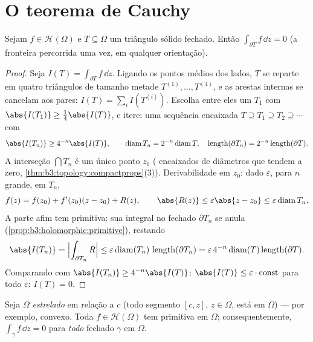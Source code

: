 \section{O teorema de Cauchy}

\begin{theorem}[Goursat]\label{thm:b3:holomorphic:goursat}
Sejam $f \in \mathcal H(\Omega)$ e $T \subseteq \Omega$ um triângulo sólido fechado. Então $\int_{\partial T}f\,\dd z = 0$ (a fronteira
percorrida uma vez, em qualquer orientação).
\end{theorem}

\begin{proof}
Seja $I(T) = \int_{\partial T}f\,\dd z$. Ligando os pontos médios dos lados, $T$ se reparte em
quatro triângulos de tamanho metade $T^{(1)},
\dots, T^{(4)}$, e as arestas internas se
cancelam aos pares: $I(T) =
\sum_iI(T^{(i)})$. Escolha entre eles um $T_1$ com $\abs{I(T_1)} \geq \frac14\abs{I(T)}$, e
itere: uma sequência encaixada $T \supseteq T_1 \supseteq T_2 \supseteq\cdots$ com
\[
\abs{I(T_n)} \geq 4^{-n}\abs{I(T)},
\qquad
\operatorname{diam}T_n = 2^{-n}\operatorname{diam}T,
\quad
\operatorname{length}(\partial T_n) =
2^{-n}\operatorname{length}(\partial T).
\]
A interseção $\bigcap T_n$ é um único ponto $z_0$ ( encaixados de
diâmetros que tendem a zero, \cref{thm:b3:topology:compactprops}(3)). Derivabilidade em
$z_0$: dado $\varepsilon$, para $n$ grande, em $T_n$,
\[
f(z) = f(z_0) + f'(z_0)(z - z_0) + R(z),
\qquad \abs{R(z)} \leq \varepsilon\abs{z - z_0} \leq
\varepsilon\operatorname{diam}T_n .
\]
A parte afim tem primitiva: sua integral no fechado $\partial T_n$ se anula
(\cref{prop:b3:holomorphic:primitive}), restando
\[
\abs{I(T_n)} = \Bigl|\int_{\partial T_n}R\Bigr|
\leq \varepsilon\operatorname{diam}(T_n)\,
\operatorname{length}(\partial T_n)
= \varepsilon\,4^{-n}\operatorname{diam}(T)
\operatorname{length}(\partial T) .
\]
Comparando com $\abs{I(T_n)} \geq 4^{-n}\abs{I(T)}$: $\abs{I(T)} \leq \varepsilon\cdot\text{const}$ para todo $\varepsilon$: $I(T) = 0$.
\end{proof}

\begin{theorem}
\label{thm:b3:holomorphic:cauchy}
Seja $\Omega$ \emph{estrelado} em relação a $c$ (todo segmento
$[c, z]$, $z \in \Omega$, está em $\Omega$) --- por exemplo, convexo. Toda
$f \in \mathcal H(\Omega)$ tem primitiva em $\Omega$; consequentemente, $\int_\gamma f\,\dd z = 0$ para
\emph{todo}  fechado $\gamma$ em $\Omega$.
\end{theorem}

